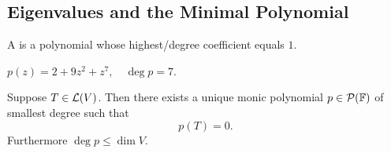 \subsection{Eigenvalues and the Minimal Polynomial}


\begin{mydef} 
  A  is a polynomial whose highest\-/degree coefficient equals $1$.
\end{mydef}
\begin{example}
  $p(z)=2+9z^2+z^7, \quad \deg p = 7$.
\end{example}

\begin{thm}
  \label{thm: unique monice polynomial of smallest degree}
  Suppose $T\in \mathcal{L}(V)$. Then there exists a unique monic polynomial $p\in \mathcal{P}(\mathbb{F})$ of smallest degree such that
  \begin{equation}
    p(T)=0.
  \end{equation}
  Furthermore $\deg p \leq \dim V$.
\end{thm}
